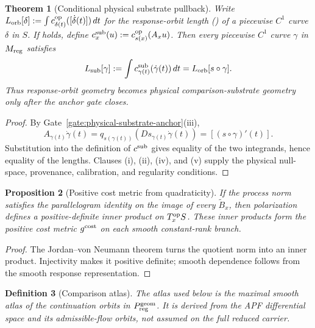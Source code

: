 \documentclass[11pt]{article}
\newtheorem{theorem}{Theorem}[section]
\newtheorem{proposition}[theorem]{Proposition}
\newtheorem{definition}[theorem]{Definition}
\theoremstyle{remark}
\begin{document}
\begin{theorem}[Conditional physical substrate pullback]
\label{thm:anchored-cost-geometry}
Write $L_{\rm orb}[\delta]:=\int c^{\rm op}_{\delta(t)}([\dot\delta(t)])\,dt$
for the response-orbit length () of a
piecewise $C^1$ curve $\delta$ in $S$.  If
 holds, define
$c_x^{\rm sub}(u):=c_{s(x)}^{\rm op}(A_xu)$.  Then every piecewise $C^1$ curve
$\gamma$ in $M_{\rm reg}$ satisfies
\[
  L_{\rm sub}[\gamma]
  :=\int c^{\rm sub}_{\gamma(t)}(\dot\gamma(t))\,dt
  =L_{\rm orb}[s\circ\gamma].
\]
Thus response-orbit geometry becomes physical comparison-substrate geometry
only after the anchor gate closes.
\end{theorem}

\begin{proof}
By Gate~\ref{gate:physical-substrate-anchor}(iii),
\[
A_{\gamma(t)}\dot\gamma(t)
=q_{s(\gamma(t))}\!\left(Ds_{\gamma(t)}\dot\gamma(t)\right)
=[(s\circ\gamma)'(t)].
\]
Substitution into the definition of $c^{\rm sub}$ gives equality of the two
integrands, hence equality of the lengths.  Clauses (i), (ii), (iv), and (v)
supply the physical null-space, provenance, calibration, and regularity
conditions.
\end{proof}

\begin{proposition}[Positive cost metric from quadraticity]
\label{prop:positive-cost-metric}
If the process norm satisfies the parallelogram identity on the image of every
$\widetilde B_x$, then polarization defines a positive-definite inner product
on $T_x^{\rm op}S$.  These inner products form the positive cost metric
$g^{\rm cost}$ on each smooth constant-rank branch.
\end{proposition}

\begin{proof}
The Jordan--von Neumann theorem turns the quotient norm into an inner product.
Injectivity makes it positive definite; smooth dependence follows from the
smooth response representation.
\end{proof}

\begin{definition}[Comparison atlas]
The atlas used below is the maximal smooth atlas of the continuation orbits in
$P^{\rm geom}_{\rm reg}$.  It is derived from the APF differential space and
its admissible-flow orbits, not assumed on the full reduced carrier.
\end{definition}
\end{document}
